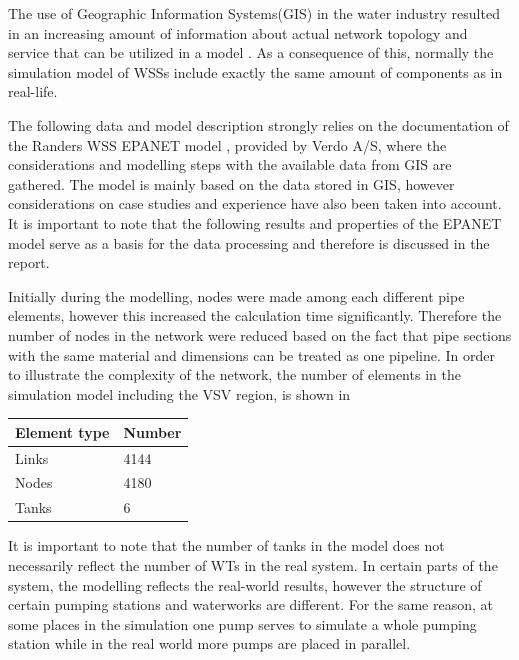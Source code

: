 The use of Geographic Information Systems(GIS) in the water industry resulted in an increasing amount of information about actual network topology and service that can be utilized in a model \cite{johnson2016geographic}. As a consequence of this, normally the simulation model of WSSs include exactly the same amount of components as in real-life. 

The following data and model description strongly relies on the documentation of the Randers WSS EPANET model \cite{verdo_doc}, provided by Verdo A/S, where the considerations and modelling steps with the available data from GIS are gathered. The model is mainly based on the data stored in GIS, however considerations on case studies and experience have also been taken into account. It is important to note that the following results and properties of the EPANET model serve as a basis for the data processing and therefore is discussed in the report.  

Initially during the modelling, nodes were made among each different pipe elements, however this increased the calculation time significantly. Therefore the number of nodes in the network were reduced based on the fact that pipe sections with the same material and dimensions can be treated as one pipeline. In order to illustrate the complexity of the network, the number of elements in the simulation model including the VSV region, is shown in 

\begin{center}
\label{numberofelements_table}
    \begin{tabular}{ | p{3cm} | p{3cm} |}
    \hline
    \textbf{Element type} & \textbf{Number}  \\ 
    \hline
    Links & 4144  \\ 
    \hline
    Nodes & 4180  \\ 
    \hline
    Tanks & 6  \\ 
    \hline
    \end{tabular}
\end{center}

It is important to note that the number of tanks in the model does not necessarily reflect the number of WTs in the real system. In certain parts of the system, the modelling reflects the real-world results, however the structure of certain pumping stations and waterworks are different. For the same reason, at some places in the simulation one pump serves to simulate a whole pumping station while in the real world more pumps are placed in parallel. 

